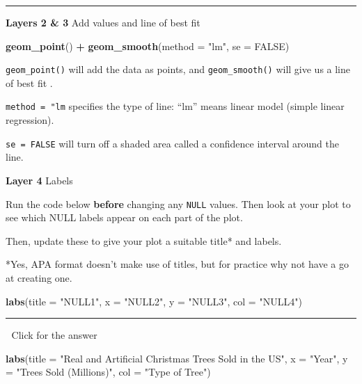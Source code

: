 \documentclass[
]{book}
\newenvironment{Shaded}{\begin{snugshade}}{\end{snugshade}}
\newcommand{\AttributeTok}[1]{\textcolor[rgb]{0.13,0.29,0.53}{#1}}
\newcommand{\ConstantTok}[1]{\textcolor[rgb]{0.56,0.35,0.01}{#1}}
\newcommand{\FunctionTok}[1]{\textcolor[rgb]{0.13,0.29,0.53}{\textbf{#1}}}
\newcommand{\NormalTok}[1]{#1}
\newcommand{\SpecialCharTok}[1]{\textcolor[rgb]{0.81,0.36,0.00}{\textbf{#1}}}
\newcommand{\StringTok}[1]{\textcolor[rgb]{0.31,0.60,0.02}{#1}}
\begin{document}
\begin{center}\rule{0.5\linewidth}{0.5pt}\end{center}

\textbf{Layers 2 \& 3} Add values and line of best fit

\begin{Shaded}
\begin{Highlighting}[]
\FunctionTok{geom\_point}\NormalTok{() }\SpecialCharTok{+}
\FunctionTok{geom\_smooth}\NormalTok{(}\AttributeTok{method =} \StringTok{"lm"}\NormalTok{, }\AttributeTok{se =} \ConstantTok{FALSE}\NormalTok{)}
\end{Highlighting}
\end{Shaded}

\texttt{geom\_point()} will add the data as points, and \texttt{geom\_smooth()} will give us a line of best fit .

\texttt{method\ =\ "lm} specifies the type of line: ``lm'' means linear model (simple linear regression).

\texttt{se\ =\ FALSE} will turn off a shaded area called a confidence interval around the line.

\textbf{Layer 4} Labels

Run the code below \textbf{before} changing any \texttt{NULL} values. Then look at your plot to see which NULL labels appear on each part of the plot.

Then, update these to give your plot a suitable title* and labels.

*Yes, APA format doesn't make use of titles, but for practice why not have a go at creating one.

\begin{Shaded}
\begin{Highlighting}[]
\FunctionTok{labs}\NormalTok{(}\AttributeTok{title =} \StringTok{"NULL1"}\NormalTok{,}
    \AttributeTok{x =} \StringTok{"NULL2"}\NormalTok{,}
    \AttributeTok{y =} \StringTok{"NULL3"}\NormalTok{,}
    \AttributeTok{col =} \StringTok{"NULL4"}\NormalTok{) }
\end{Highlighting}
\end{Shaded}

\begin{center}\rule{0.5\linewidth}{0.5pt}\end{center}

👀 Click for the answer

\begin{Shaded}
\begin{Highlighting}[]
\FunctionTok{labs}\NormalTok{(}\AttributeTok{title =} \StringTok{"Real and Artificial Christmas Trees Sold in the US"}\NormalTok{,}
    \AttributeTok{x =} \StringTok{"Year"}\NormalTok{,}
    \AttributeTok{y =} \StringTok{"Trees Sold (Millions)"}\NormalTok{,}
    \AttributeTok{col =} \StringTok{"Type of Tree"}\NormalTok{) }
\end{Highlighting}
\end{Shaded}
\end{document}
